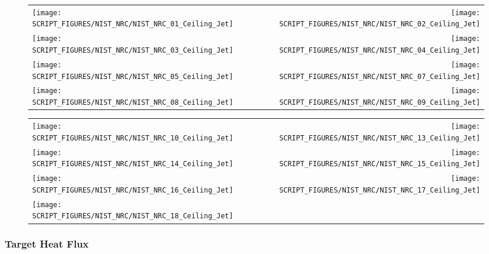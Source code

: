\begin{figure}[!ht]
\begin{tabular*}{\textwidth}{l@{\extracolsep{\fill}}r}
\texttt{[image: SCRIPT\_FIGURES/NIST\_NRC/NIST\_NRC\_01\_Ceiling\_Jet]} &
\texttt{[image: SCRIPT\_FIGURES/NIST\_NRC/NIST\_NRC\_02\_Ceiling\_Jet]} \\
\texttt{[image: SCRIPT\_FIGURES/NIST\_NRC/NIST\_NRC\_03\_Ceiling\_Jet]} &
\texttt{[image: SCRIPT\_FIGURES/NIST\_NRC/NIST\_NRC\_04\_Ceiling\_Jet]} \\
\texttt{[image: SCRIPT\_FIGURES/NIST\_NRC/NIST\_NRC\_05\_Ceiling\_Jet]} &
\texttt{[image: SCRIPT\_FIGURES/NIST\_NRC/NIST\_NRC\_07\_Ceiling\_Jet]} \\
\texttt{[image: SCRIPT\_FIGURES/NIST\_NRC/NIST\_NRC\_08\_Ceiling\_Jet]} &
\texttt{[image: SCRIPT\_FIGURES/NIST\_NRC/NIST\_NRC\_09\_Ceiling\_Jet]}
\end{tabular*}
\end{figure}

\begin{figure}[!ht]
\begin{tabular*}{\textwidth}{l@{\extracolsep{\fill}}r}
\texttt{[image: SCRIPT\_FIGURES/NIST\_NRC/NIST\_NRC\_10\_Ceiling\_Jet]} &
\texttt{[image: SCRIPT\_FIGURES/NIST\_NRC/NIST\_NRC\_13\_Ceiling\_Jet]} \\
\texttt{[image: SCRIPT\_FIGURES/NIST\_NRC/NIST\_NRC\_14\_Ceiling\_Jet]} &
\texttt{[image: SCRIPT\_FIGURES/NIST\_NRC/NIST\_NRC\_15\_Ceiling\_Jet]} \\
\texttt{[image: SCRIPT\_FIGURES/NIST\_NRC/NIST\_NRC\_16\_Ceiling\_Jet]} &
\texttt{[image: SCRIPT\_FIGURES/NIST\_NRC/NIST\_NRC\_17\_Ceiling\_Jet]} \\
\texttt{[image: SCRIPT\_FIGURES/NIST\_NRC/NIST\_NRC\_18\_Ceiling\_Jet]}
\end{tabular*}
\end{figure}

\clearpage

\subsubsection{Target Heat Flux}

